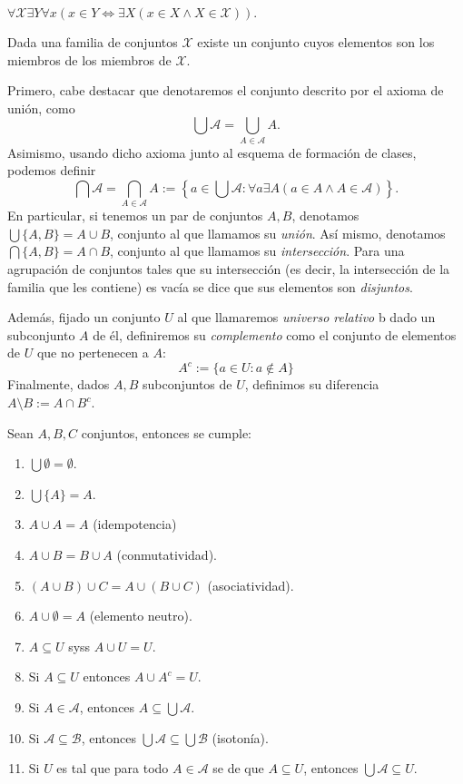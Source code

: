 \documentclass[11pt,a4paper]{book}
\begin{document}
\begin{axiom}[de Unión (ZF-5)]
	$\forall\mathcal{X}\exists Y\forall x(x\in Y\iff\exists X(x\in X\wedge X\in\mathcal{X})).$

	Dada una familia de conjuntos $\mathcal{X}$ existe un conjunto cuyos elementos son los miembros de los miembros de $\mathcal{X}$.
\end{axiom}
\begin{mydef}
	Primero, cabe destacar que denotaremos el conjunto descrito por el axioma de unión, como 
	$$\bigcup\mathcal{A}=\bigcup_{A\in\mathcal{A}}A.$$
	Asimismo, usando dicho axioma junto al esquema de formación de clases, podemos definir
	$$\bigcap\mathcal{A}=\bigcap_{A\in\mathcal{A}}A:=\left\{a\in\bigcup\mathcal{A}:\forall a\exists A(a\in A\wedge A\in\mathcal{A})\right\}.$$
	En particular, si tenemos un par de conjuntos $A,B$, denotamos $\bigcup\{A,B\}=A\cup B$, conjunto al que llamamos su \textit{unión}. Así mismo, denotamos $\bigcap\{A,B\}=A\cap B$, conjunto al que llamamos su \textit{intersección}. Para una agrupación de conjuntos tales que su intersección (es decir, la intersección de la familia que les contiene) es vacía se dice que sus elementos son \textit{disjuntos}.

	Además, fijado un conjunto $U$ al que llamaremos \textit{universo relativo} b dado un subconjunto $A$ de él, definiremos su \textit{complemento} como el conjunto de elementos de $U$ que no pertenecen a $A$:
	$$A^c:=\{a\in U:a\notin A\}$$
	Finalmente, dados $A,B$ subconjuntos de $U$, definimos su diferencia $A\setminus B:=A\cap B^c$.
\end{mydef}
\begin{prop}
	Sean $A,B,C$ conjuntos, entonces se cumple:
	\begin{enumerate}
		\item $\bigcup\emptyset = \emptyset$.
		\item $\bigcup\{A\} = A$.
		\item $A\cup A=A$ (idempotencia)
		\item $A\cup B=B\cup A$ (conmutatividad).
		\item $(A\cup B)\cup C=A\cup(B\cup C)$ (asociatividad).
		\item $A\cup\emptyset=A$ (elemento neutro).
		\item $A\subseteq U$ syss $A\cup U=U$.
		\item Si $A\subseteq U$ entonces $A\cup A^c=U$.
		\item Si $A\in\mathcal{A}$, entonces $A\subseteq\bigcup\mathcal{A}$.
		\item Si $\mathcal{A}\subseteq\mathcal{B}$, entonces $\bigcup\mathcal{A}\subseteq\bigcup\mathcal{B}$ (isotonía).
		\item Si $U$ es tal que para todo $A\in\mathcal{A}$ se de que $A\subseteq U$, entonces $\bigcup\mathcal{A}\subseteq U$.
	\end{enumerate}
\end{prop}
\end{document}
